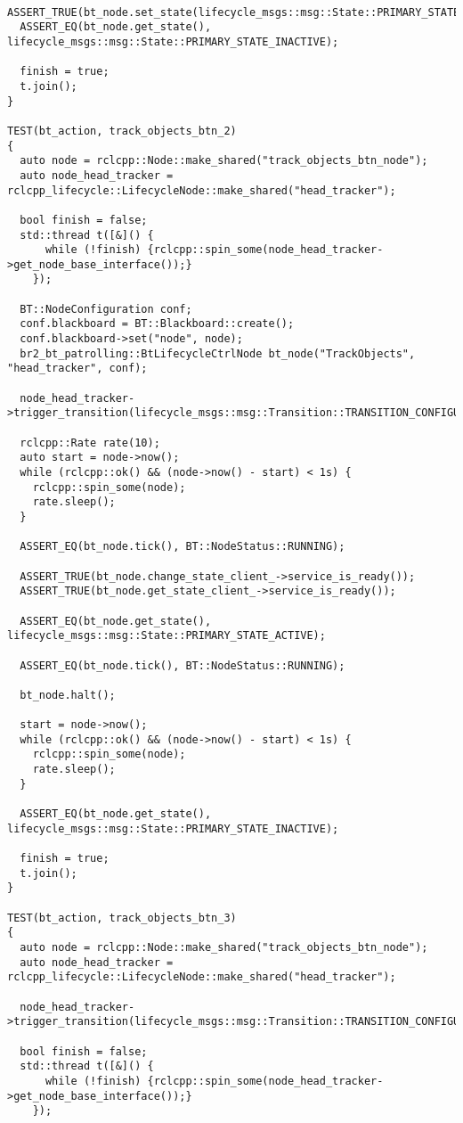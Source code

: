 \begin{tcolorbox}[sharp corners, colframe=gray!80, colback=LightGray, left=0pt, top=0pt, bottom=0pt, title=\texttt{br2\_bt\_patrolling/tests/bt\_action\_test.cpp}]
\begin{verbatim}
  ASSERT_TRUE(bt_node.set_state(lifecycle_msgs::msg::State::PRIMARY_STATE_INACTIVE));
  ASSERT_EQ(bt_node.get_state(), lifecycle_msgs::msg::State::PRIMARY_STATE_INACTIVE);

  finish = true;
  t.join();
}

TEST(bt_action, track_objects_btn_2)
{
  auto node = rclcpp::Node::make_shared("track_objects_btn_node");
  auto node_head_tracker = rclcpp_lifecycle::LifecycleNode::make_shared("head_tracker");

  bool finish = false;
  std::thread t([&]() {
      while (!finish) {rclcpp::spin_some(node_head_tracker->get_node_base_interface());}
    });

  BT::NodeConfiguration conf;
  conf.blackboard = BT::Blackboard::create();
  conf.blackboard->set("node", node);
  br2_bt_patrolling::BtLifecycleCtrlNode bt_node("TrackObjects", "head_tracker", conf);

  node_head_tracker->trigger_transition(lifecycle_msgs::msg::Transition::TRANSITION_CONFIGURE);

  rclcpp::Rate rate(10);
  auto start = node->now();
  while (rclcpp::ok() && (node->now() - start) < 1s) {
    rclcpp::spin_some(node);
    rate.sleep();
  }

  ASSERT_EQ(bt_node.tick(), BT::NodeStatus::RUNNING);

  ASSERT_TRUE(bt_node.change_state_client_->service_is_ready());
  ASSERT_TRUE(bt_node.get_state_client_->service_is_ready());

  ASSERT_EQ(bt_node.get_state(), lifecycle_msgs::msg::State::PRIMARY_STATE_ACTIVE);

  ASSERT_EQ(bt_node.tick(), BT::NodeStatus::RUNNING);

  bt_node.halt();

  start = node->now();
  while (rclcpp::ok() && (node->now() - start) < 1s) {
    rclcpp::spin_some(node);
    rate.sleep();
  }

  ASSERT_EQ(bt_node.get_state(), lifecycle_msgs::msg::State::PRIMARY_STATE_INACTIVE);

  finish = true;
  t.join();
}

TEST(bt_action, track_objects_btn_3)
{
  auto node = rclcpp::Node::make_shared("track_objects_btn_node");
  auto node_head_tracker = rclcpp_lifecycle::LifecycleNode::make_shared("head_tracker");

  node_head_tracker->trigger_transition(lifecycle_msgs::msg::Transition::TRANSITION_CONFIGURE);

  bool finish = false;
  std::thread t([&]() {
      while (!finish) {rclcpp::spin_some(node_head_tracker->get_node_base_interface());}
    });


\end{verbatim}
\end{tcolorbox}
